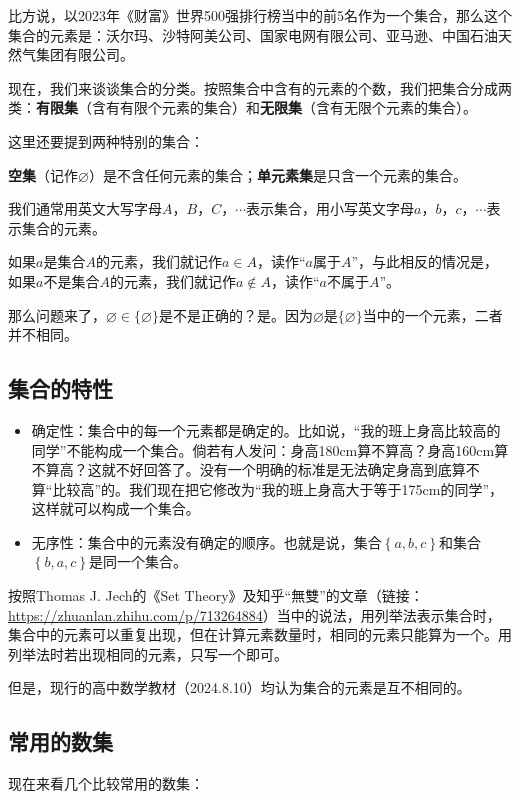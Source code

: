 \documentclass[lang=cn,math=cm,chinesefont=nofont,11pt,scheme=chinese,onecol]{elegantbook}
\begin{document}
比方说，以2023年《财富》世界500强排行榜当中的前5名作为一个集合，那么这个集合的元素是：沃尔玛、沙特阿美公司、国家电网有限公司、亚马逊、中国石油天然气集团有限公司。

现在，我们来谈谈集合的分类。按照集合中含有的元素的个数，我们把集合分成两类：\textbf{有限集}（含有有限个元素的集合）和\textbf{无限集}（含有无限个元素的集合）。

这里还要提到两种特别的集合：

\textbf{空集}（记作$\varnothing$）是不含任何元素的集合；\textbf{单元素集}是只含一个元素的集合。

\hspace*{\fill}

我们通常用英文大写字母$A$，$B$，$C$，$\cdots$表示集合，用小写英文字母$a$，$b$，$c$，$\cdots$表示集合的元素。

如果$a$是集合$A$的元素，我们就记作$a\in A$，读作“$a$属于$A$”，与此相反的情况是，如果$a$不是集合$A$的元素，我们就记作$a\notin A$，读作“$a$不属于$A$”。

那么问题来了，$\varnothing \in \{\varnothing\}$是不是正确的？是。因为$\varnothing$是$\{\varnothing\}$当中的一个元素，二者并不相同。

\subsection{集合的特性}

\begin{itemize}
  \item 确定性：集合中的每一个元素都是确定的。比如说，“我的班上身高比较高的同学”不能构成一个集合。倘若有人发问：身高180cm算不算高？身高160cm算不算高？这就不好回答了。没有一个明确的标准是无法确定身高到底算不算“比较高”的。我们现在把它修改为“我的班上身高大于等于175cm的同学”，这样就可以构成一个集合。
  
  \item 无序性：集合中的元素没有确定的顺序。也就是说，集合$\left\{a,b,c \right\}$和集合$\left\{b,a,c \right\}$是同一个集合。
\end{itemize}

按照Thomas J. Jech的《Set Theory》及知乎“無雙”的文章（链接：\href{https://zhuanlan.zhihu.com/p/713264884}{https://zhuanlan.zhihu.com/p/713264884}）当中的说法，用列举法表示集合时，集合中的元素可以重复出现，但在计算元素数量时，相同的元素只能算为一个。用列举法时若出现相同的元素，只写一个即可。

但是，现行的高中数学教材（2024.8.10）均认为集合的元素是互不相同的。

\subsection{常用的数集}
现在来看几个比较常用的数集：
\end{document}
